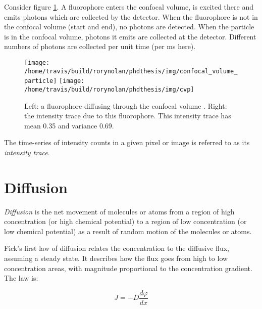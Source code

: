 \documentclass[12pt,]{book}
\theoremstyle{definition}
\theoremstyle{definition}
\theoremstyle{definition}
\theoremstyle{remark}
\let\BeginKnitrBlock\begin \let\EndKnitrBlock\end
\begin{document}
Consider figure \ref{fig:confocal-volume-particle}. A fluorophore enters
the confocal volume, is excited there and emits photons which are
collected by the detector. When the fluorophore is not in the confocal
volume (start and end), no photons are detected. When the particle is in
the confocal volume, photons it emits are collected at the detector.
Different numbers of photons are collected per unit time (per ms here).






\begin{figure}

\texttt{[image: /home/travis/build/rorynolan/phdthesis/img/confocal\_volume\_particle]} \texttt{[image: /home/travis/build/rorynolan/phdthesis/img/cvp]} \hfill{}

\caption{Left: a fluorophore diffusing
through the confocal volume \citep{sphd}. Right: the intensity trace due
to this fluorophore. This intensity trace has mean 0.35 and variance
0.69.}\label{fig:confocal-volume-particle}
\end{figure}

\BeginKnitrBlock{definition}
\protect\hypertarget{def:unnamed-chunk-9}{}{\label{def:unnamed-chunk-9} }The
time-series of intensity counts in a given pixel or image is referred to
as its \emph{intensity trace}.
\EndKnitrBlock{definition}

\section{Diffusion}\label{diffusion}

\BeginKnitrBlock{definition}
\protect\hypertarget{def:unnamed-chunk-10}{}{\label{def:unnamed-chunk-10}
}\emph{Diffusion} is the net movement of molecules or atoms from a
region of high concentration (or high chemical potential) to a region of
low concentration (or low chemical potential) as a result of random
motion of the molecules or atoms.
\EndKnitrBlock{definition}

Fick's first law of diffusion relates the concentration to the diffusive
flux, assuming a steady state. It describes how the flux goes from high
to low concentration areas, with magnitude proportional to the
concentration gradient. The law is:

\begin{equation}
J = -D\frac{d\varphi}{dx}
\label{eq:ficksfirst}
\end{equation}
\end{document}
